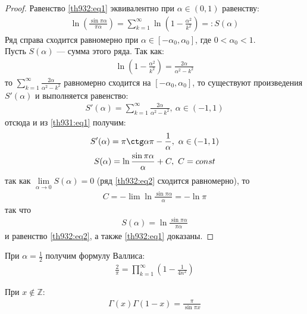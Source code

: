 \begin{proof}
  Равенство \eqref{th932:eq1} эквивалентно при $\alpha \in (0, 1)$ равенству:
  \begin{gather}
    \ln \left(\frac{\sin \pi \alpha}{\pi \alpha}\right) = \sum\limits_{k =
    1}^{\infty} \ln \left(1 - \frac{\alpha^2}{k^2} \right) =: S(\alpha)
    \label{th932:eq2}
  \end{gather}
  Ряд справа сходится равномерно при $\alpha \in [-\alpha_0, \alpha_0]$, где $0
  < \alpha_0 < 1$. \\
  Пусть $S(\alpha)$ --- сумма этого ряда. Так как:
  \begin{gather*}
    \ln \left(1 - \frac{\alpha^2}{k^2}\right) = \frac{2\alpha}{\alpha^2 - k^2}
  \end{gather*}
  то $\sum\limits_{k = 1}^{\infty} \frac{2\alpha}{\alpha^2 - k^2}$
  равномерно сходится на $[-\alpha_0, \alpha_0]$, то существуют произведения
  $S'(\alpha)$ и выполняется равенство:
  \begin{gather*}
    S'(\alpha) = \sum\limits_{k = 1}^{\infty} \frac{2\alpha}{\alpha^2 - k^2}, \
    \alpha \in (-1, 1)
  \end{gather*}
  отсюда и из \eqref{th931:eq1} получим:
  \begin{gather*}
    S'(\alpha) = \pi \ctg \alpha \pi - \frac{1}{\alpha}, \ \alpha \in (-1, 1) \\
    S(\alpha) = \ln \frac{\sin \pi \alpha}{\alpha} + C, \ C = const
  \end{gather*}
  так как $\lim\limits_{\alpha \to 0} S(\alpha) = 0$ (ряд \eqref{th932:eq2}
  сходится равномерно), то
  \begin{gather*}
    C = - \lim \ln \frac{\sin \pi \alpha}{\alpha} = - \ln \pi
  \end{gather*}
  так что
  \begin{gather*}
    S(\alpha) = \ln \frac{\sin \pi \alpha}{\pi \alpha}
  \end{gather*}
  и равенство \eqref{th932:eq2}, а также \eqref{th932:eq1} доказаны.
\end{proof}

\begin{consequence}
  При $\alpha = \frac{1}{2}$ получим формулу Валлиса:
  \begin{gather}
    \frac{2}{\pi} = \prod\limits_{k = 1}^\infty \left(1 - \frac{1}{4n^2}\right)
    \label{th932:eq3}
  \end{gather}
\end{consequence}

\begin{theorem}
  При $x \not \in \mathbb{Z}$:
  \begin{gather}
    \Gamma(x) \Gamma(1 - x) = \frac{\pi}{\sin \pi x}
    \label{th933:eq1}
  \end{gather}
\end{theorem}

